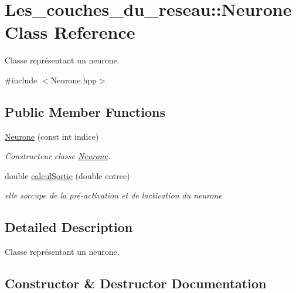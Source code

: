 \hypertarget{class_les__couches__du__reseau_1_1_neurone}{}\section{Les\+\_\+couches\+\_\+du\+\_\+reseau\+:\+:Neurone Class Reference}
\label{class_les__couches__du__reseau_1_1_neurone}


Classe représentant un neurone.  




{\ttfamily \#include $<$Neurone.\+hpp$>$}

\subsection*{Public Member Functions}
\begin{DoxyCompactItemize}
\item 
\hyperlink{class_les__couches__du__reseau_1_1_neurone_a7bc8947e7cf4101ee3a12bb001f889d2}{Neurone} (const int indice)
\begin{DoxyCompactList}\small\item\em Constructeur classe \hyperlink{class_les__couches__du__reseau_1_1_neurone}{Neurone}. \end{DoxyCompactList}\item 
double \hyperlink{class_les__couches__du__reseau_1_1_neurone_a05325684bcf9f4f042b4bf9ce8415afc}{calcul\+Sortie} (double entree)
\begin{DoxyCompactList}\small\item\em elle s\textquotesingle{}occupe de la pré-\/activation et de l\textquotesingle{}activation du neurone \end{DoxyCompactList}\end{DoxyCompactItemize}


\subsection{Detailed Description}
Classe représentant un neurone. 

\subsection{Constructor \& Destructor Documentation}
\mbox{\label{class_les__couches__du__reseau_1_1_neurone_a7bc8947e7cf4101ee3a12bb001f889d2}} 
